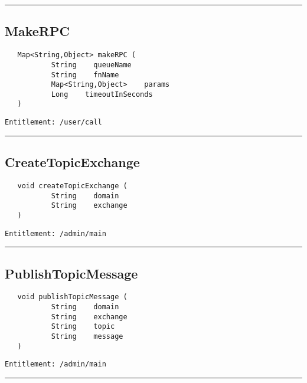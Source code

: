 \rule{12cm}{2pt}
\subsection{MakeRPC}
\label{Api:MakeRPC}
\begin{verbatim}
   Map<String,Object> makeRPC (
           String    queueName
           String    fnName
           Map<String,Object>    params
           Long    timeoutInSeconds
   )
\end{verbatim}
\begin{Verbatim}[fontsize=\small, formatcom=\color{Maroon}]
  Entitlement: /user/call
\end{Verbatim}



\rule{12cm}{2pt}
\subsection{CreateTopicExchange}
\label{Api:CreateTopicExchange}
\begin{verbatim}
   void createTopicExchange (
           String    domain
           String    exchange
   )
\end{verbatim}
\begin{Verbatim}[fontsize=\small, formatcom=\color{Maroon}]
  Entitlement: /admin/main
\end{Verbatim}



\rule{12cm}{2pt}
\subsection{PublishTopicMessage}
\label{Api:PublishTopicMessage}
\begin{verbatim}
   void publishTopicMessage (
           String    domain
           String    exchange
           String    topic
           String    message
   )
\end{verbatim}
\begin{Verbatim}[fontsize=\small, formatcom=\color{Maroon}]
  Entitlement: /admin/main
\end{Verbatim}



\rule{12cm}{2pt}

